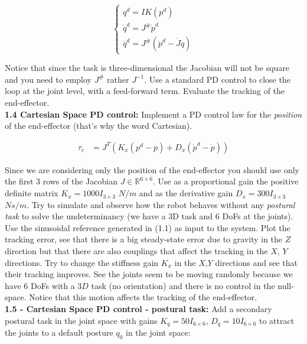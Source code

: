 \documentclass[11pt]{article}
\newcommand{\Rnum}{\mathbb{R}} %
\begin{document}
\begin{equation*}
\begin{cases}
q^d = IK(p^d) \\
\dot{q}^d =  J^{\#} \dot{p}^d \\
\ddot{q}^d =  J^{\#} ( \ddot{p}^d - \dot{J}\dot{q} )
\end{cases}
\end{equation*}

Notice that since the task is three-dimensional the Jacobian will not be square and you need to employ $J^{\#}$ rather $J^{-1}$.
Use a standard PD control to close the loop at the joint level, with a feed-forward term. Evaluate the tracking of the end-effector.\\



\textbf{1.4  Cartesian Space PD control:}
Implement a PD control law for the \textit{position} of the end-effector (that's why the word Cartesian). 


\begin{align}
\tau_c & = J^T\left(K_x(p^d - p) + D_x(\dot{p}^d -\dot{p})\right)
\end{align}

Since we are considering only the position of the end-effector you should use only the first 3 rows of the Jacobian $J \in \Rnum^{6 \times 6}$. 
Use  as  a proportional gain the positive definite matrix $K_x = 1000I_{3\times3}$ $N/m$ and as the derivative gain $D_x  = 300I_{3\times3}$ $Ns/m$. 
Try to simulate and observe how the robot behaves without any \textit{postural task} 
to solve the undeterminancy (we have a 3D task and 6 DoFs at the joints).
Use the sinusoidal reference generated in (1.1) as input to the system. Plot the tracking error, see that there is a big steady-state error due to gravity in the $Z$ direction but that there are also couplings that affect  the tracking in the 
$X$, $Y$ directions. Try to change the stiffness gain $K_x$ in the $X$,$Y$ directions and see that their tracking improves. See the joints seem to be moving randomly because we have 6 DoFs with a $3D$ task (no orientation) and there is no control in the null-space. Notice that this motion affects the tracking of the end-effector. \\


\textbf{1.5 - Cartesian Space PD control - postural task:}
Add  a secondary postural task in the joint space with  gains $K_q= 50 I_{6 \times6}$,   $D_q = 10I_{6 \times6}$ to attract the joints to a default posture $q_0$ in the joint space:
\end{document}
